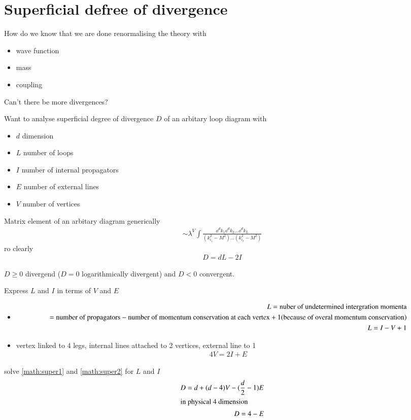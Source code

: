 \section{Superficial defree of divergence}
How do we know that we are done renormalising the theory with
\begin{itemize}
	\item wave function
	\item mass
	\item coupling
\end{itemize}
Can't there be more divergences?

Want to analyse superficial degree of divergence $D$ of an arbitary loop diagram with 
\begin{itemize}
	\item $d$ dimension
	\item $L$ number of loops
	\item $I$ number of internal propagators
	\item $E$ number of external lines
	\item $V$ number of vertices
\end{itemize}

Matrix element of an arbitary diagram generically 
\begin{align*}
	\sim \lambda^V \int \frac{\dd^d k_1 \dd^d k_2 \dots \dd^d k_L}{(k_{i_1}^2 - M^2) \dots (k_{i_I}^2 - M^2)}
\end{align*}
ro clearly 
\begin{align}
	D = d L - 2 I
\end{align}

$D \geq 0 $ divergend ($D=0$ logarithmically divergent) and $D < 0$ convergent.

Express $L$ and $I$ in terms of $V$ and $E$
\begin{itemize}
	\item 
		\begin{align}
			L = \text{nuber of undetermined intergration momenta} \notag \\
			= \text{number of propagators} - \text{number of momentum conservation at each vertex} + 1 \text{(because of overal momentum conservation)} \notag \\
			L = I - V + 1 \label{math:super1}
		\end{align}
	\item vertex linked to 4 legs, internal lines attached to 2 vertices, external line to 1
		\begin{align}
			4V = 2I + E \label{math:super2}
		\end{align}
\end{itemize}
solve \ref{math:super1} and \ref{math:super2} for $L$ and $I$
\begin{align}
	D = d + (d-4) V - (\frac{d}{2} - 1)E \\
	\shortintertext{in physical 4 dimension}
	D = 4 - E
\end{align}

